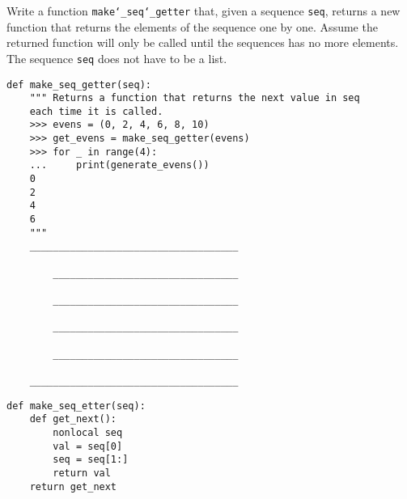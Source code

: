 \begin{blocksection}
\question Write a function \texttt{make\char`_seq\char`_getter} that, given a sequence \texttt{seq}, returns a new function that returns the elements of the sequence one by one. Assume the returned function will only be called until the sequences has no more elements. The sequence \texttt{seq} does not have to be a list.

\begin{lstlisting}
def make_seq_getter(seq):
    """ Returns a function that returns the next value in seq
    each time it is called.
    >>> evens = (0, 2, 4, 6, 8, 10)
    >>> get_evens = make_seq_getter(evens)
    >>> for _ in range(4):
    ...     print(generate_evens())
    0
    2
    4
    6
    """
    ____________________________________
        
        ________________________________
        
        ________________________________
        
        ________________________________
        
        ________________________________

    ____________________________________
\end{lstlisting}

\begin{solution}
\begin{lstlisting}
def make_seq_etter(seq):
    def get_next():
        nonlocal seq
        val = seq[0]
        seq = seq[1:]
        return val
    return get_next
\end{lstlisting}
\end{solution}

\end{blocksection}


